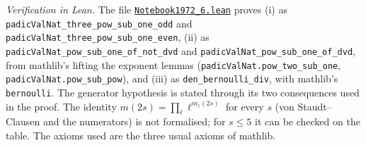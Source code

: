 \emph{Verification in Lean.} The file \href{\leanblobmain/Notebook1972_6.lean}{\texttt{Notebook1972\_6.\allowbreak{}lean}} proves (i) as \texttt{padicValNat\_three\_pow\_sub\_one\_odd} and \texttt{padicValNat\_three\_pow\_sub\_one\_even}, (ii) as \texttt{padicValNat\_pow\_sub\_one\_of\_not\_dvd} and \texttt{padicValNat\_pow\_sub\_one\_of\_dvd}, from mathlib's lifting the exponent lemmas (\texttt{padicValNat.pow\_two\_sub\_one}, \texttt{padicValNat.pow\_sub\_pow}), and (iii) as \texttt{den\_bernoulli\_div}, with mathlib's \texttt{bernoulli}. The generator hypothesis is stated through its two consequences used in the proof. The identity $m(2s) = \prod_\ell \ell^{m_\ell(2s)}$ for every $s$ (von Staudt--Clausen and the numerators) is not formalised; for $s \le 5$ it can be checked on the table. The axioms used are the three usual axioms of mathlib.

